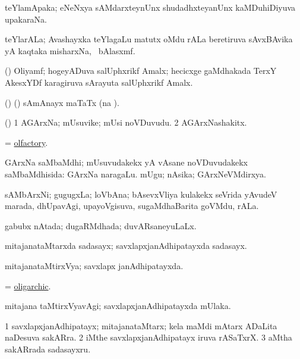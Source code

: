 \bentry
{}
\gl{\nA}
\bmng
teYlamApaka; eNeNxya sAMdarxteynUnx shudadhxteyanUnx kaMDuhiDiyuva upakaraNa. 
\emng
\eentry

\bentry
{}
\gl{\nA}
\bmng
teYlarALa; Avashayxka teYlagaLu matutx oMdu rALa beretiruva sAvxBAvika yA kaqtaka misharxNa, \udA\ bAlasxmf. 
\emng
\eentry

\bentry
{}
\gl{\nA}
\bmng
(\ravi) Oliyamf; hogeyADuva salUphxrikf Amalx; hecicxge gaMdhakada TerxY AkesxYDf karagiruva sArayuta salUphxrikf Amalx. 
\emng
\eentry

\bentry
{}
\gl{\nA}
\bmng
(\birx) (\ca) sAmAnayx maTaTx (na \saMkiSx). 
\emng
\eentry

\bentry
{}
\gl{\nA}
\bmng
(\veYshA) 
\bnum
\num{1} AGArxNa; mUsuvike; mUsi noVDuvudu. 
\num{2} AGArxNashakitx. 
\enum
\emng
\eentry

\bentry
{}
\gl{\gu}
\bmng
= \hyperlink{olfactory}{olfactory}. 
\emng
\eentry

\bentry
{}
\gl{\gu}
\bmng
GArxNa saMbaMdhi; mUsuvudakekx yA vAsane noVDuvudakekx saMbaMdhisida:  GArxNa naragaLu.  mUgu; nAsika; GArxNeVMdirxya. 
\emng
\eentry

\bentry
{}
\gl{\nA}
\bmng
sAMbArxNi; gugugxLa; loVbAna; bAsevxVliya kulakekx seVrida yAvudeV marada, dhUpavAgi, upayoVgisuva, sugaMdhaBarita goVMdu, rALa. 
\emng
\eentry

\bentry
{}
\gl{\gu}
\bmng
gabubx nAtada; dugaRMdhada; duvARsaneyuLaLx. 
\emng
\eentry

\bentry
{}
\gl{\nA}
\bmng
mitajanataMtarxda sadasayx; savxlapxjanAdhipatayxda sadasayx. 
\emng
\eentry

\bentry
{}
\gl{\gu}
\bmng
mitajanataMtirxVya; savxlapx janAdhipatayxda. 
\emng
\eentry

\bentry
{}
\gl{\gu}
\bmng
= \hyperlink{oligarchic}{oligarchic}. 
\emng
\eentry

\bentry
{}
\gl{\kirxvi}
\bmng
mitajana taMtirxVyavAgi; savxlapxjanAdhipatayxda mUlaka. 
\emng
\eentry

\bentry
{}
\gl{\nA}
\bmng
\bnum
\num{1} savxlapxjanAdhipatayx; mitajanataMtarx; kela maMdi mAtarx ADaLita naDesuva sakARra. 
\num{2} iMthe savxlapxjanAdhipatayx iruva rASaTxrX. 
\num{3} aMtha sakARrada sadasayxru. 
\enum
\emng
\eentry

